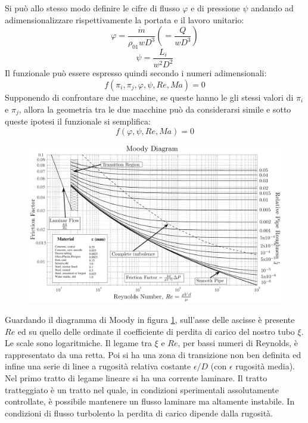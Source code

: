 Si può allo stesso modo definire le cifre di flusso $\varphi$ e di pressione $\psi$ andando ad adimensionalizzare rispettivamente la portata e il lavoro unitario:
\begin{equation}
\varphi = \frac{\dot{m}}{\rho_{01}w D^3} \left( =\frac{Q}{w D^3} \right)
\end{equation}
\begin{equation}
\psi = \frac{L_i}{w^2 D^2}
\end{equation}
Il funzionale può essere espresso quindi secondo i numeri adimensionali:
\begin{equation}
f(\pi_i,\pi_j,\varphi,\psi,Re,Ma)=0
\end{equation}
Supponendo di confrontare due macchine, se queste hanno le gli stessi valori di $\pi_i$ e $\pi_j$, allora la geometria tra le due macchine può da considerarsi simile e sotto queste ipotesi il funzionale si semplifica:
\begin{equation}
f(\varphi,\psi,Re,Ma)=0
\end{equation}
\begin{figure}
\centering
  \includegraphics[width=\textwidth]{fig/moody.jpg}
\caption{}
\label{fig:moody}
\end{figure}
Guardando il diagramma di Moody in figura \ref{fig:moody}, sull'asse delle ascisse è presente $Re$ ed su quello delle ordinate il coefficiente di perdita di carico del nostro tubo $\xi$. Le scale sono logaritmiche. Il legame tra $\xi$ e $Re$, per bassi numeri di Reynolds, è rappresentato da una retta. Poi si ha una zona di transizione non ben definita ed infine una serie di linee a rugosità relativa costante $\epsilon/D$ (con $\epsilon$ rugosità media).\\
Nel primo tratto di legame lineare si ha una corrente laminare. Il tratto tratteggiato è un tratto nel quale, in condizioni sperimentali assolutamente controllate, è possibile mantenere un flusso laminare ma altamente instabile. In condizioni di flusso turbolento la perdita di carico dipende dalla rugosità.\\
